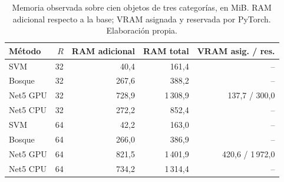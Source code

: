 \begin{table}[htbp]\centering\small
\caption{Memoria observada sobre cien objetos de tres categorías, en MiB. RAM adicional respecto a la base; VRAM asignada y reservada por PyTorch. Elaboración propia.}\label{tab:memoria-final}
\setlength{\tabcolsep}{4pt}
\begin{tabular}{@{}lrrrr@{}}\toprule
Método & $R$ & RAM adicional & RAM total & VRAM asig. / res. \\\midrule
SVM & 32 & 40,4 & 161,4 & -- \\
Bosque & 32 & 267,6 & 388,2 & -- \\
Net5 GPU & 32 & 728,9 & 1\,308,9 & 137,7 / 300,0 \\
Net5 CPU & 32 & 272,2 & 852,4 & -- \\
SVM & 64 & 42,2 & 163,0 & -- \\
Bosque & 64 & 266,0 & 386,9 & -- \\
Net5 GPU & 64 & 821,5 & 1\,401,9 & 420,6 / 1\,972,0 \\
Net5 CPU & 64 & 734,2 & 1\,314,4 & -- \\
\bottomrule\end{tabular}\end{table}
